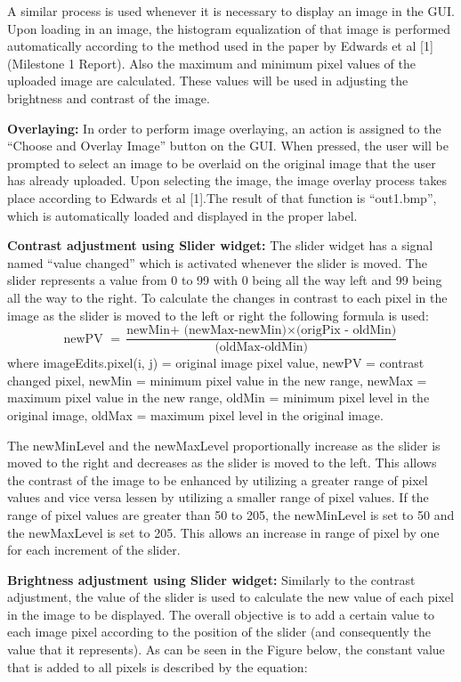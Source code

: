 \documentclass{article}
\begin{document}
\begin{multicols*}{2}
A similar process is used whenever it is necessary to display an image in the GUI.
Upon loading in an image, the histogram equalization of that image is performed automatically according to the method used in the paper by Edwards et al [1] (Milestone 1 Report). Also the maximum and minimum pixel values of the uploaded image are calculated. These values will be used in adjusting the brightness and contrast of the image.

{\bf Overlaying:} 
In order to perform image overlaying, an action is assigned to the “Choose and Overlay Image” button on the GUI. When pressed, the user will be prompted to select an image to be overlaid on the original image that the user has already uploaded. Upon selecting the image, the image overlay process takes place according to  Edwards et al [1].The result of that function is “out1.bmp”, which is automatically loaded and displayed in the proper label.

{\bf Contrast adjustment using Slider widget:} 
The slider widget has a signal named “value changed” which is activated whenever the slider is moved. The slider represents a value from 0 to 99 with 0 being all the way left and 99 being all the way to the right. To calculate the changes in contrast to each pixel in the image as the slider is moved to the left or right the following formula is used:\\

\[\text{newPV }= \frac{ \text{newMin+ (newMax-newMin)}   \times  \text{(origPix - oldMin)}}{\text{(oldMax-oldMin)}} \] 
where 
imageEdits.pixel(i, j) = original image pixel value,
newPV = contrast changed pixel,
newMin = minimum pixel value in the new range,
newMax = maximum pixel value in the new range,
oldMin = minimum pixel level in the original image,
oldMax = maximum pixel level in the original image.
          
The newMinLevel and the newMaxLevel proportionally increase as the slider is moved to the right and decreases as the slider is moved to the left. This allows the contrast of the image to be enhanced by utilizing a greater range of pixel values and vice versa lessen by utilizing a smaller range of pixel values. If the range of pixel values are greater than 50 to 205, the newMinLevel is set to 50 and the newMaxLevel is set to 205. This allows an increase in range of pixel by one for each increment of the slider. 

{\bf Brightness adjustment using Slider widget:} 
Similarly to the contrast adjustment, the value of the slider is used to calculate the new value of each pixel in the image to be displayed. The overall objective is to add a certain value to each image pixel according to the position of the slider (and consequently the value that it represents). As can be seen in the Figure below, the constant value that is added to all pixels is described by the equation: \\


\end{multicols*}
\end{document}
